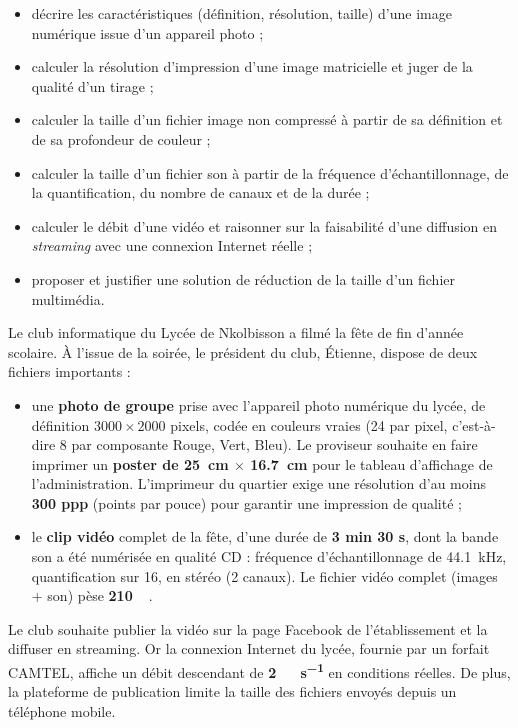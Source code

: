 \documentclass[11pt]{article}
\newcommand{\cle}[1]{{\popxbold\color{popdark}#1}}
\newcounter{popsec}
\newcounter{popsub}
\newcommand{\courssub}[1]{%
  \stepcounter{popsub}%
  \par\vspace{9pt}\noindent{\popxbold\fontsize{11.5}{13}\selectfont\color{popink}{\color{poporange}\thepopsec.\thepopsub}\hspace{6pt}#1}\par\nopagebreak\vspace{4pt}
}
\begin{document}
\begin{itemize}
\item \cle{décrire} les caractéristiques (définition, résolution, taille) d'une image numérique issue d'un appareil photo ;
\item \cle{calculer} la résolution d'impression d'une image matricielle et juger de la qualité d'un tirage ;
\item \cle{calculer} la taille d'un fichier image non compressé à partir de sa définition et de sa profondeur de couleur ;
\item \cle{calculer} la taille d'un fichier son à partir de la fréquence d'échantillonnage, de la quantification, du nombre de canaux et de la durée ;
\item \cle{calculer} le débit d'une vidéo et raisonner sur la faisabilité d'une diffusion en \emph{streaming} avec une connexion Internet réelle ;
\item \cle{proposer} et justifier une solution de réduction de la taille d'un fichier multimédia.
\end{itemize}

\courssub{Situation}

Le club informatique du Lycée de Nkolbisson a filmé la fête de fin d'année scolaire. À l'issue de la soirée, le président du club, Étienne, dispose de deux fichiers importants :

\begin{itemize}
\item une \textbf{photo de groupe} prise avec l'appareil photo numérique du lycée, de définition $3000 \times 2000$ pixels, codée en couleurs vraies (\SI{24}{\bit} par pixel, c'est-à-dire \SI{8}{\bit} par composante Rouge, Vert, Bleu). Le proviseur souhaite en faire imprimer un \textbf{poster de \SI{25}{\centi\meter} $\times$ \SI{16,7}{\centi\meter}} pour le tableau d'affichage de l'administration. L'imprimeur du quartier exige une résolution d'au moins \textbf{300 ppp} (points par pouce) pour garantir une impression de qualité ;
\item le \textbf{clip vidéo} complet de la fête, d'une durée de \textbf{3 min 30 s}, dont la bande son a été numérisée en qualité CD : fréquence d'échantillonnage de \SI{44,1}{\kilo\hertz}, quantification sur \SI{16}{\bit}, en stéréo (2 canaux). Le fichier vidéo complet (images + son) pèse \textbf{\SI{210}{\mega\byte}}.
\end{itemize}

Le club souhaite publier la vidéo sur la page Facebook de l'établissement et la diffuser en streaming. Or la connexion Internet du lycée, fournie par un forfait CAMTEL, affiche un débit descendant de \textbf{\SI{2}{\mega\bit\per\second}} en conditions réelles. De plus, la plateforme de publication limite la taille des fichiers envoyés depuis un téléphone mobile.
\end{document}
